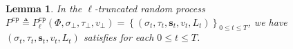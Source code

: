 \documentclass[11pt]{article}
\newtheorem{lemma}[theorem]{Lemma}
\newcommand{\set}[1]{\left\{#1\right\}}
\def\!#1{\mathtt{#1}}
\newcommand{\seqS}{\boldsymbol{s}}
\begin{document}

\begin{lemma}\label{lemma-trp-correctness}
In the $\ell$-truncated random process $P^{\!{cp}} \triangleq P^{\!{cp}}_\ell(\Phi, \sigma_\bot, \tau_\bot, v_\bot) = \set{(\sigma_t, \tau_t, \seqS_t, v_t, L_t)}_{0\leq t \leq T}$, we have 
$(\sigma_t, \tau_t,\seqS_t, v_t, L_t)$ satisfies  for each $0\leq t \leq T$.
\end{lemma}








\end{document}
